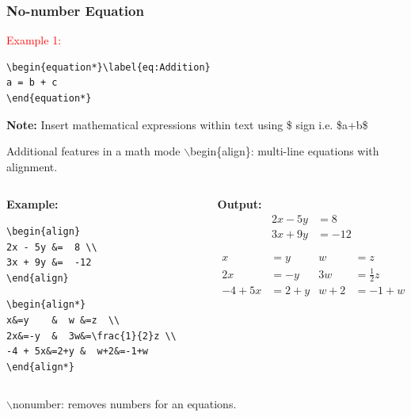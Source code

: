 \documentclass [9pt] {beamer}
\begin{document}
\begin{frame}[fragile]\frametitle{No-number Equation}
\rm
\fontsize{9pt}{11pt}\selectfont
\textcolor{red}{Example 1:}
\begin{verbatim}
\begin{equation*}\label{eq:Addition}
a = b + c
\end{equation*}

\end{verbatim}
{\bf Note: } Insert mathematical expressions within text using \$ sign i.e. \$a+b\$
\end{frame}

\begin{frame}[fragile]{Additional features in a math mode}
\textcolor[rgb]{0.98,0.00,0.00}{$\backslash$begin\{align\}}: multi-line equations with alignment.
\newline

\begin{columns}
	\scriptsize
	\begin{column}{4cm}
		\textbf{Example:}
		
\begin{verbatim}
\begin{align} 
2x - 5y &=  8 \\ 
3x + 9y &=  -12
\end{align}
\end{verbatim} 
		
\begin{verbatim}
\begin{align*}
x&=y    &  w &=z  \\
2x&=-y  &  3w&=\frac{1}{2}z \\
-4 + 5x&=2+y &  w+2&=-1+w          
\end{align*}
\end{verbatim}
\end{column}

\begin{column}{4cm}
		\textbf{Output:}
		\begin{align} 
		2x - 5y &=  8 \\ 
		3x + 9y &=  -12
		\end{align}
		
		\begin{align*}
		x&=y           &  w &=z              \\
		2x&=-y         &  3w&=\frac{1}{2}z  \\
		-4 + 5x&=2+y   &  w+2&=-1+w          
		\end{align*}
	\end{column}
\end{columns}

\textcolor[rgb]{0.98,0.00,0.00}{$\backslash$nonumber}: removes numbers for an equations.
\end{frame}
\end{document}
